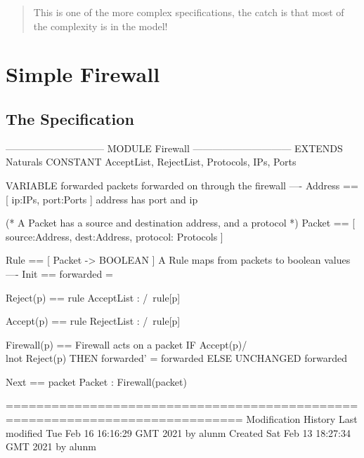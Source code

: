 \documentclass[12pt]{article}
\begin{document}
\begin{abstract}
	This is one of the more complex specifications,  the catch is that most of
	the complexity is in the model!
\end{abstract}

\section{Simple Firewall}
\subsection{The Specification} 
\begin{tla}
------------------------------ MODULE Firewall ------------------------------
EXTENDS Naturals
CONSTANT AcceptList,
         RejectList,
         Protocols,
         IPs,
         Ports

VARIABLE forwarded \* packets forwarded on through the firewall
----
Address == [ ip:IPs, port:Ports ] \* address has port and ip

(*
A Packet has a source and destination address,
and a protocol
*)
Packet  == [ source:Address,
             dest:Address,
             protocol: Protocols ]

Rule == [ Packet -> BOOLEAN ] \* A Rule maps from packets to boolean values
----
Init == forwarded = {}

Reject(p) ==
    \E rule \in AcceptList :
        /\ rule[p]

Accept(p) ==
    \E rule \in RejectList :
        /\ rule[p]

Firewall(p) == \* Firewall acts on a packet
    IF Accept(p)/\\lnot Reject(p) 
    THEN forwarded' = forwarded 
    ELSE UNCHANGED forwarded
    
Next ==
    \E packet \in Packet : Firewall(packet)

=============================================================================
\* Modification History
\* Last modified Tue Feb 16 16:16:29 GMT 2021 by alunm
\* Created Sat Feb 13 18:27:34 GMT 2021 by alunm
\end{tla}
\end{document}
